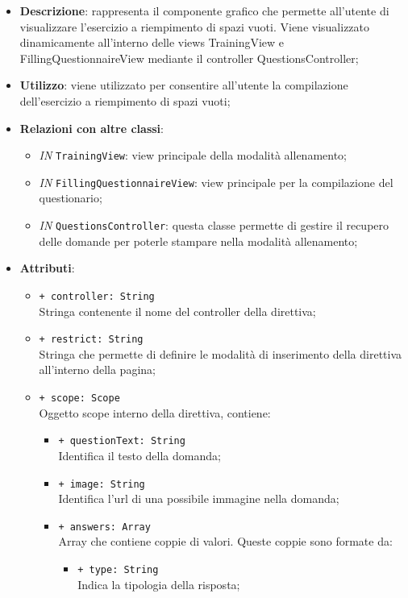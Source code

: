 		\begin{itemize}
			\item \textbf{Descrizione}: rappresenta il componente grafico che permette all'utente di visualizzare l'esercizio a riempimento di spazi vuoti. Viene visualizzato dinamicamente all'interno delle views TrainingView e FillingQuestionnaireView mediante il controller QuestionsController;
			\item \textbf{Utilizzo}: viene utilizzato per consentire all'utente la compilazione dell'esercizio a riempimento di spazi vuoti;
			\item \textbf{Relazioni con altre classi}: 
			\begin{itemize}
				\item \textit{IN} \texttt{TrainingView}: view principale della modalità allenamento; 
				\item \textit{IN} \texttt{FillingQuestionnaireView}: view principale per la compilazione del questionario;
				\item \textit{IN} \texttt{QuestionsController}: questa classe permette di gestire il recupero delle domande per poterle stampare nella modalità allenamento;
			\end{itemize}
			\item \textbf{Attributi}: 
			\begin{itemize}
				\item \texttt{+ controller: String} \\ Stringa contenente il nome del controller della direttiva;
				\item \texttt{+ restrict: String} \\ Stringa che permette di definire le modalità di inserimento della direttiva all'interno della pagina;
				\item \texttt{+ scope: Scope} \\ Oggetto scope interno della direttiva, contiene:
				\begin{itemize}
					\item \texttt{+ questionText: String} \\ Identifica il testo della domanda;
					\item \texttt{+ image: String} \\ Identifica l'url di una possibile immagine nella domanda;
					\item \texttt{+ answers: Array} \\ Array che contiene coppie di valori. Queste coppie sono formate da:
					\begin{itemize}
						\item \texttt{+ type: String} \\ Indica la tipologia della risposta;

\end{itemize}
\end{itemize}
\end{itemize}
\end{itemize}
